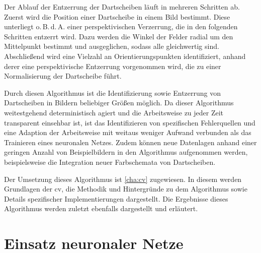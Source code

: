 Der Ablauf der Entzerrung der Dartscheiben läuft in mehreren Schritten ab. Zuerst wird die Position einer Dartscheibe in einem Bild bestimmt. Diese unterliegt o.\,B.\,d.\,A. einer perspektivischen Verzerrung, die in den folgenden Schritten entzerrt wird. Dazu werden die Winkel der Felder radial um den Mittelpunkt bestimmt und ausgeglichen, sodass alle gleichwertig sind. Abschließend wird eine Vielzahl an Orientierungspunkten identifiziert, anhand derer eine perspektivische Entzerrung vorgenommen wird, die zu einer Normalisierung der Dartscheibe führt.

Durch diesen Algorithmus ist die Identifizierung sowie Entzerrung von Dartscheiben in Bildern beliebiger Größen möglich. Da dieser Algorithmus weitestgehend deterministisch agiert und die Arbeitsweise zu jeder Zeit transparent einsehbar ist, ist das Identifizieren von spezifischen Fehlerquellen und eine Adaption der Arbeitsweise mit weitaus weniger Aufwand verbunden als das Trainieren eines neuronalen Netzes. Zudem können neue Datenlagen anhand einer geringen Anzahl von Beispielbildern in den Algorithmus aufgenommen werden, beispielsweise die Integration neuer Farbschemata von Dartscheiben.

Der Umsetzung dieses Algorithmus ist \autoref{cha:cv} zugewiesen. In diesem werden Grundlagen der \ac{cv}, die Methodik und Hintergründe zu dem Algorithmus sowie Details spezifischer Implementierungen dargestellt. Die Ergebnisse dieses Algorithmus werden zuletzt ebenfalls dargestellt und erläutert.



\section{Einsatz neuronaler Netze}
\label{sec:einsatz_nn}


